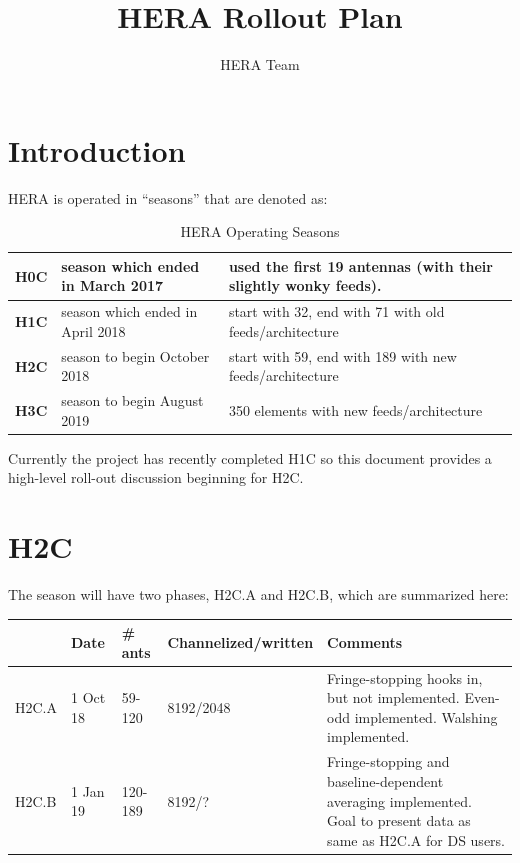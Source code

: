 \documentclass{article}
\begin{document}
\author{HERA Team}
\title{HERA Rollout Plan}
\maketitle

\setcounter{section}{-1}
\section{Introduction}
HERA is operated in ``seasons'' that are denoted as:

\begin{table}[H]
\caption{HERA Operating Seasons}
\begin{tabular}{p{0.5in} p{2.2in} p{3.5in}} \hline
{\bf H0C} & season which ended in March 2017 & used the first 19 antennas (with their slightly wonky feeds). \\ \hline
{\bf H1C} & season which ended in April 2018 & start with 32, end with 71 with old feeds/architecture\\ \hline
{\bf H2C} & season to begin October 2018 & start with 59, end with 189 with new feeds/architecture\\ \hline
{\bf H3C} & season to begin August 2019 & 350 elements with new feeds/architecture \\ \hline
\end{tabular}
\end{table}

Currently the project has recently completed H1C so this document provides a high-level roll-out discussion beginning for H2C.


\section{H2C}
The season will have two phases, H2C.A and H2C.B, which are summarized here:

\vspace{0.5cm}
\begin{tabular}{l l l l p{2.5in}}
 & \textbf{Date} & \textbf{\# ants} & \textbf{Channelized/written} & \textbf{Comments} \\ \hline
H2C.A & 1 Oct 18 & 59-120 & 8192/2048 & Fringe-stopping hooks in, but not implemented.  Even-odd implemented. Walshing implemented.\\ \hline
H2C.B & 1 Jan 19 & 120-189 & 8192/? & Fringe-stopping and baseline-dependent averaging implemented.  Goal to present data as same as H2C.A for DS users. \\ \hline
\end{tabular}
\vspace{1cm}
\end{document}
